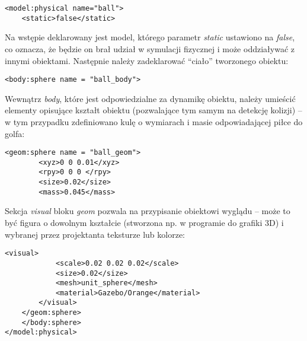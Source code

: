 \begin{lstlisting}[name=gazebo_przyklad_pilka]
<model:physical name="ball">
    <static>false</static>
\end{lstlisting}
Na wstępie deklarowany jest model, którego parametr \textit{static} ustawiono na \textit{false}, co oznacza, że będzie on brał udział
w symulacji fizycznej i może oddziaływać z innymi obiektami. Następnie należy zadeklarować ``ciało'' tworzonego obiektu:
\begin{lstlisting}[name=gazebo_przyklad_pilka]
    <body:sphere name = "ball_body">	
\end{lstlisting}
Wewnątrz \textit{body}, które jest odpowiedzialne za dynamikę obiektu, należy umieścić elementy opisujące kształt obiektu (pozwalające tym samym na detekcję kolizji) -- w tym przypadku zdefiniowano kulę o wymiarach i masie odpowiadającej piłce do golfa:
\begin{lstlisting}[name=gazebo_przyklad_pilka]
	<geom:sphere name = "ball_geom">
		<xyz>0 0 0.01</xyz>
		<rpy>0 0 0 </rpy>
		<size>0.02</size>
		<mass>0.045</mass>
\end{lstlisting}
Sekcja \textit{visual} bloku \textit{geom} pozwala na przypisanie obiektowi wyglądu -- może to być figura o dowolnym kształcie (stworzona np. w programie do grafiki 3D) i wybranej przez projektanta teksturze lub kolorze:
\begin{lstlisting}[name=gazebo_przyklad_pilka]
		<visual>	
			<scale>0.02 0.02 0.02</scale>
			<size>0.02</size>
			<mesh>unit_sphere</mesh>
			<material>Gazebo/Orange</material>
		</visual>
	</geom:sphere>				
    </body:sphere>
</model:physical>
\end{lstlisting}	

